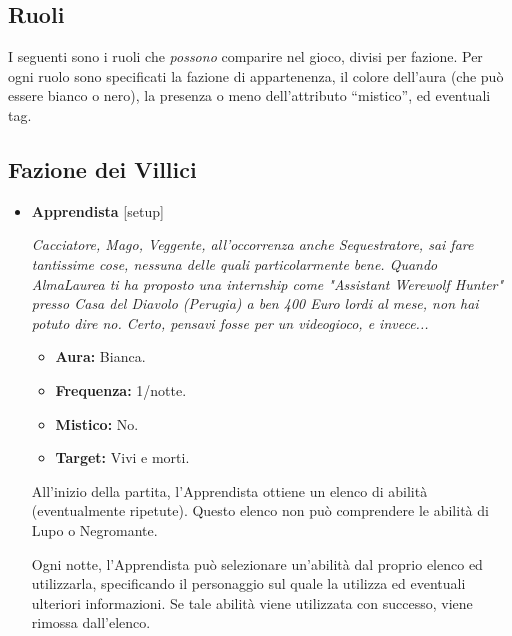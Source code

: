 \documentclass[a4paper,10pt]{article}
\begin{document}
\subsection{Ruoli}
\label{ruoli}

I seguenti sono i ruoli che \emph{possono} comparire nel gioco, divisi per fazione. Per ogni ruolo sono specificati la fazione di appartenenza, il colore dell'aura (che può essere bianco o nero), la presenza o meno dell'attributo ``mistico'', ed eventuali tag.

\subsection*{Fazione dei Villici}

\begin{itemize}

      \item \textbf{Apprendista} [setup]

            \emph{Cacciatore, Mago, Veggente, all'occorrenza anche Sequestratore, sai fare tantissime cose, nessuna delle quali particolarmente bene. Quando AlmaLaurea ti ha proposto una internship come "Assistant Werewolf Hunter" presso Casa del Diavolo (Perugia) a ben 400 Euro lordi al mese, non hai potuto dire no. Certo, pensavi fosse per un videogioco, e invece...}

            \begin{multicols}{2}
                  \begin{itemize}
                        \item \textbf{Aura:} Bianca.
                        \item \textbf{Frequenza:} 1/notte.
                        \item \textbf{Mistico:} No.
                        \item \textbf{Target:} Vivi e morti.
                  \end{itemize}
            \end{multicols}

            All'inizio della partita, l'Apprendista ottiene un elenco di abilità (eventualmente ripetute). Questo elenco non può comprendere le abilità di Lupo o Negromante.

            Ogni notte, l'Apprendista può selezionare un'abilità dal proprio elenco ed utilizzarla, specificando il personaggio sul quale la utilizza ed eventuali ulteriori informazioni. Se tale abilità viene utilizzata con successo, viene rimossa dall'elenco.


\end{itemize}
\end{document}
